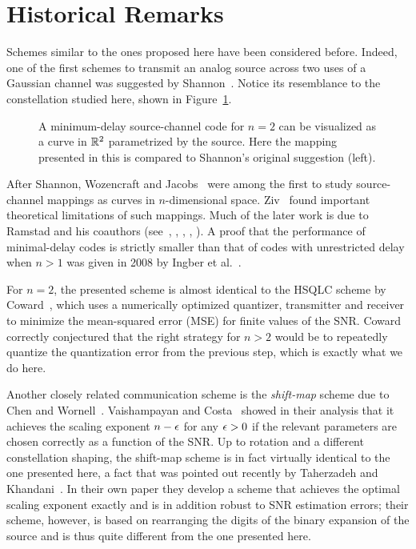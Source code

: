 \section{Historical Remarks}

Schemes similar to the ones proposed here have been considered before. Indeed,
one of the first schemes to transmit an analog source across two uses of a
Gaussian channel was suggested by Shannon~\cite{Shannon1949}. Notice its
resemblance to the constellation studied here, shown in
Figure~\ref{fig:shannoncomparison}.
\begin{figure}
  \centerline{
  \hfil
  \subfloat[Mapping proposed in this paper
  (for~$n=2$).]{} }%
  \caption{A minimum-delay source-channel code for $n=2$ can be visualized as a
  curve in $\mathbb{R}^2$ parametrized by the source. Here the mapping
  presented in this  is compared to Shannon's original
  suggestion (left).} \label{fig:shannoncomparison}
\end{figure}

After Shannon, Wozencraft and Jacobs~\cite{WozencraftJ1965} were among the first
to study source-channel mappings as curves in $n$-dimensional space.
Ziv~\cite{Ziv1970} found important theoretical limitations of such mappings.
Much of the later work is due to Ramstad and his coauthors
(see~\cite{Ramstad2002}, \cite{FloorR2006}, \cite{CowardR2000,CowardR2000a},
\cite{WernerssonSR2007}, \cite{HeklandFR2009}). A proof that the performance of
minimal-delay codes is strictly smaller than that of codes with unrestricted
delay when $n>1$ was given in 2008 by Ingber et al.~\cite{IngberLZF2008}.

For $n=2$, the presented scheme is almost identical to the HSQLC scheme by
Coward~\cite{Coward2001}, which uses a numerically optimized quantizer,
transmitter and receiver to minimize the mean-squared error (MSE) for finite
values of the SNR. Coward correctly conjectured that the right strategy for $n >
2$ would be to repeatedly quantize the quantization error from the previous
step, which is exactly what we do here.

Another closely related communication scheme is the \emph{shift-map} scheme due
to Chen and Wornell~\cite{ChenW1998}.  Vaishampayan and
Costa~\cite{VaishampayanC2003} showed in their analysis that it achieves the
scaling exponent $n-\epsilon$ for any $\epsilon > 0$ if the relevant parameters are chosen
correctly as a function of the SNR. Up to rotation and a different constellation
shaping, the shift-map scheme is in fact virtually identical to the one
presented here, a fact that was pointed out recently by Taherzadeh and
Khandani~\cite{TaherzadehK2008}. In their own paper they develop a scheme that
achieves the optimal scaling exponent exactly and is in addition robust to SNR
estimation errors; their scheme, however, is based on rearranging the digits of
the binary expansion of the source and is thus quite different from the one
presented here.

